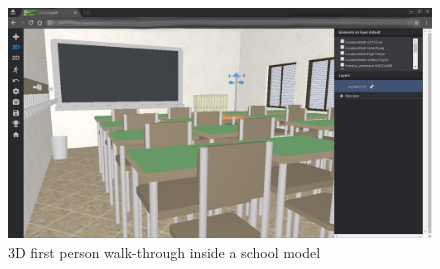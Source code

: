 \begin{figure}[htb]
\centering
\includegraphics[width=\linewidth]{contents/images/3d-school}
\caption{3D first person walk-through inside a school model}
\label{fig3D-school}
\end{figure}